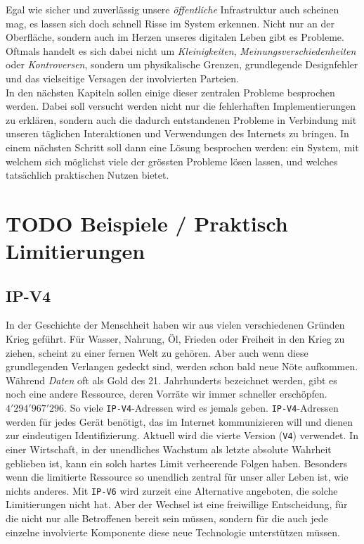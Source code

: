 \documentclass[11pt]{report}
\begin{document}
\noindent Egal wie sicher und zuverlässig unsere \emph{öffentliche}
Infrastruktur auch scheinen mag, es lassen sich doch schnell Risse im
System erkennen. Nicht nur an der Oberfläche, sondern auch im Herzen
unseres digitalen Leben gibt es Probleme. Oftmals handelt es sich
dabei nicht um \emph{Kleinigkeiten}, \emph{Meinungsverschiedenheiten} oder
\emph{Kontroversen}, sondern um physikalische Grenzen, grundlegende
Designfehler und das vielseitige Versagen der involvierten Parteien.\\

\noindent In den nächsten Kapiteln sollen einige dieser zentralen
Probleme besprochen werden. Dabei soll versucht werden nicht nur die
fehlerhaften Implementierungen zu erklären, sondern auch die dadurch
entstandenen Probleme in Verbindung mit unseren täglichen
Interaktionen und Verwendungen des Internets zu bringen. In einem
nächsten Schritt soll dann eine Lösung besprochen werden: ein System,
mit welchem sich möglichst viele der grössten Probleme lösen lassen,
und welches tatsächlich praktischen Nutzen bietet.\\
\chapter{{\bfseries\sffamily TODO} Beispiele / Praktisch Limitierungen}
\label{sec:org14ebf97}
\section{IP-V4}
\label{sec:org9714555}
\noindent In der Geschichte der Menschheit haben wir aus vielen
verschiedenen Gründen Krieg geführt. Für Wasser, Nahrung, Öl, Frieden
oder Freiheit in den Krieg zu ziehen, scheint zu einer fernen Welt zu
gehören. Aber auch wenn diese grundlegenden Verlangen gedeckt sind,
werden schon bald neue Nöte aufkommen. Während \emph{Daten} oft als Gold
des 21. Jahrhunderts bezeichnet werden, gibt es noch eine andere
Ressource, deren Vorräte wir immer schneller erschöpfen. \\

\noindent \(4'294'967'296\). So viele \texttt{IP-V4}-Adressen wird es jemals
geben. \texttt{IP-V4}-Adressen werden für jedes Gerät benötigt, das im Internet
kommunizieren will und dienen zur eindeutigen Identifizierung. Aktuell
wird die vierte Version (\texttt{V4}) verwendet. In einer Wirtschaft, in der
unendliches Wachstum als letzte absolute Wahrheit geblieben ist, kann
ein solch hartes Limit verheerende Folgen haben. Besonders wenn die
limitierte Ressource so unendlich zentral für unser aller Leben ist,
wie nichts anderes. Mit \texttt{IP-V6} wird zurzeit eine Alternative angeboten,
die solche Limitierungen nicht hat. Aber der Wechsel ist eine
freiwillige Entscheidung, für die nicht nur alle Betroffenen bereit
sein müssen, sondern für die auch jede einzelne involvierte Komponente
diese neue Technologie unterstützen müssen.\\
\end{document}
